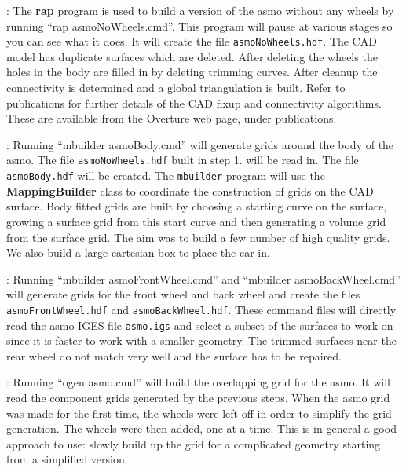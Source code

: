 : The {\bf rap} program is used to build a version
of the asmo without any wheels by running ``rap asmoNoWheels.cmd''. This program will pause
at various stages so you can see what it does. It will create the file {\tt asmoNoWheels.hdf}.
The CAD model has duplicate surfaces which are deleted. After deleting the wheels the holes
in the body are filled in by deleting trimming curves. After cleanup the 
connectivity is determined and a global triangulation is built.
Refer to publications\cite{cadProjection01,Petersson01} for further details of the CAD fixup and
connectivity algorithms. These are available from the Overture web page, under publications.
 

: Running ``mbuilder asmoBody.cmd'' will generate grids
around the body of the asmo. The file {\tt asmoNoWheels.hdf} built in step 1. will be read in. 
The file {\tt asmoBody.hdf} will be created. The {\tt mbuilder} program
will use the {\bf MappingBuilder} class to coordinate the construction of grids on 
the CAD surface. Body fitted grids are built by choosing a starting curve on the surface,
growing a surface grid from this start curve and then generating a volume grid from the
surface grid. The aim was to build a few number of high quality grids.
We also build a large cartesian box to place the car in.

: Running ``mbuilder asmoFrontWheel.cmd'' and
``mbuilder asmoBackWheel.cmd'' will generate grids for the front wheel and back wheel and
create the files {\tt asmoFrontWheel.hdf} and {\tt asmoBackWheel.hdf}.
These command files will directly read the asmo IGES file {\tt asmo.igs} and select a subset
of the surfaces to work on since it is faster to work with a smaller geometry.
The trimmed surfaces near the rear wheel do not match very well
and the surface has to be repaired.

: Running ``ogen asmo.cmd'' will build the
overlapping grid for the asmo. It will read the component grids generated by the previous steps.
When the asmo grid was made for the first time, the wheels were left off in order to
simplify the grid generation. The wheels were then added, one at a time. This is in general a good
approach to use: slowly build up the grid for a complicated geometry starting from a simplified version.


